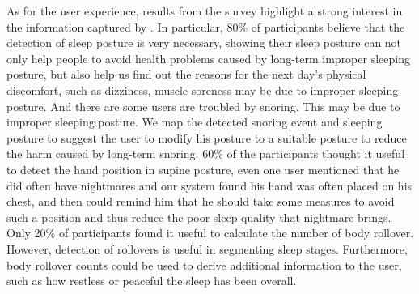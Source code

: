 As for the user experience, results from the survey highlight a strong interest in the information captured by {\systemname}. In
particular, 80\% of participants believe that the detection of sleep posture is very necessary, showing their sleep posture can not only
help people to avoid health problems caused by long-term improper sleeping posture, but also help us find out the reasons for the next
day's physical discomfort, such as dizziness, muscle soreness may be due to improper sleeping posture. And there are some users are
troubled by snoring. This may be due to improper sleeping posture. We map the detected snoring event and sleeping posture to suggest the
user to modify his posture to a suitable posture to reduce the harm caused by long-term snoring. 60\% of the participants thought it useful
to detect the hand position in supine posture, even one user mentioned that he did often have nightmares and our system found his hand was
often placed on his chest, and then {\systemname} could remind him that he should take some measures to avoid such a position and thus
reduce the poor sleep quality that nightmare brings. Only 20\% of participants found it useful to calculate the number of body rollover.
However, detection of rollovers is useful in segmenting sleep stages. Furthermore, body rollover counts could be used to derive additional
information to the user, such as how restless or peaceful the sleep has been overall.

